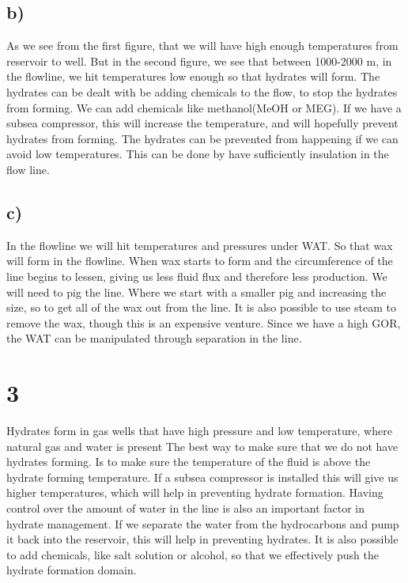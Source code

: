 \documentclass[DIV=calc, paper=a4, fontsize=13pt, twocolumn]{scrartcl}	 %
\begin{document}
\subsection*{b)}
As we see from the first figure, that we will have high enough temperatures from reservoir to well. But in the second figure, we see that between 1000-2000 m, in the flowline, we hit temperatures low enough so that hydrates will form. 
The hydrates can be dealt with be adding chemicals to the flow, to stop the hydrates from forming. We can add chemicals like methanol(MeOH or MEG). 
\newline
If we have a subsea compressor, this will increase the temperature, and will hopefully prevent hydrates from forming. 
\newline
The hydrates can be prevented from happening if we can avoid low temperatures. This can be done by have sufficiently insulation in the flow line.
\subsection*{c)}
In the flowline we will hit temperatures and pressures under WAT. So that wax will form in the flowline. When wax starts to form and the circumference of the line begins to lessen, giving us less fluid flux and therefore less production. We will need to pig the line. Where we start with a smaller pig and increasing the size, so to get all of the wax out from the line. It is also possible to use steam to remove the wax, though this is an expensive venture.
Since we have a high GOR, the WAT can be manipulated through separation in the line.
\section*{3}
Hydrates form in gas wells that have high pressure and low temperature, where natural gas and water is present
The best way to make sure that we do not have hydrates forming. Is to make sure the temperature of the fluid is above the hydrate forming temperature. If a subsea compressor is installed this will give us higher temperatures, which will help in preventing hydrate formation.
\newline
Having control over the amount of water in the line is also an important factor in hydrate management. If we separate the water from the hydrocarbons and pump it back into the reservoir, this will help in preventing hydrates.
\newline
It is also possible to add chemicals, like salt solution or alcohol, so that we effectively push the hydrate formation domain.
\end{document}
